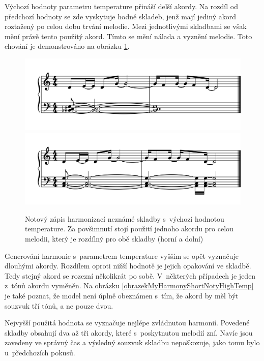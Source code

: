 Výchozí hodnoty parametru temperature přináší delší akordy.
Na rozdíl od předchozí hodnoty se zde vyskytuje hodně skladeb,
jenž mají jediný akord roztažený po celou dobu trvání melodie.
Mezi jednotlivými skladbami se však mění právě tento použitý akord.
Tímto se mění nálada a vyznění melodie.
Toto chování je demonstrováno na obrázku \ref{obrazekMyHarmonyShortNotyDefTemp}.

\begin{figure}[h]\centering
    \centering
    \includegraphics[width=0.8\linewidth]{obrazky/MyHarmonyShortDefTmp01-1.png}\\[1pt]  
    \includegraphics[width=0.8\linewidth]{obrazky/MyHarmonyShortDefTmp03-1.png}\\[1pt]  
    \caption{Notový zápis harmonizací neznámé skladby s~výchozí hodnotou temperature.
    Za povšimnutí stojí použití jednoho akordu pro celou melodii, 
    který je rozdílný pro obě skladby (horní a dolní)}    
    \label{obrazekMyHarmonyShortNotyDefTemp}
\end{figure}
\par

Generování harmonie s~parametrem temperature vyšším se opět vyznačuje
dlouhými akordy.
Rozdílem oproti nižší hodnotě je jejich opakování ve skladbě.
Tedy stejný akord se rozezní několikrát po sobě.
V~některých případech je jeden z~tónů akordu vyměněn.
Na obrázku \ref{obrazekMyHarmonyShortNotyHighTemp} je také poznat,
že model není úplně obeznámen s~tím,
že akord by měl být souzvuk tří tónů, a ne pouze dvou.
\par
Nejvyšší použitá hodnota se vyznačuje nejlépe zvládnutou harmonií.
Povedené skladby obsahují dva až tři akordy,
které s~poskytnutou melodií zní.
Navíc jsou zavedeny ve správný čas 
a výsledný souzvuk skladbu nepoškozuje,
jako tomu bylo u~předchozích pokusů.

